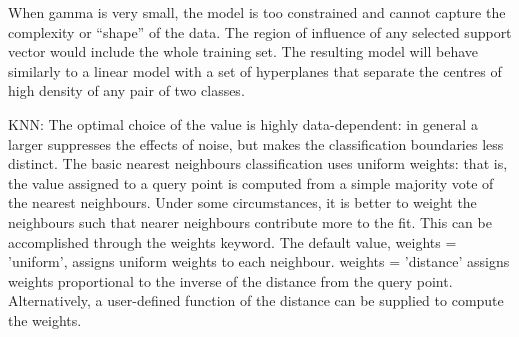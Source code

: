 \documentclass[runningheads]{llncs}
\begin{document}
When gamma is very small, the model is too constrained and cannot capture the complexity or “shape” of the data. The region of influence of any selected support vector would include the whole training set. The resulting model will behave similarly to a linear model with a set of hyperplanes that separate the centres of high density of any pair of two classes.

KNN: 
The optimal choice of the value  is highly data-dependent: in general a larger  suppresses the effects of noise, but makes the classification boundaries less distinct.
The basic nearest neighbours classification uses uniform weights: that is, the value assigned to a query point is computed from a simple majority vote of the nearest neighbours. Under some circumstances, it is better to weight the neighbours such that nearer neighbours contribute more to the fit. This can be accomplished through the weights keyword. The default value, weights = 'uniform', assigns uniform weights to each neighbour. weights = 'distance' assigns weights proportional to the inverse of the distance from the query point. Alternatively, a user-defined function of the distance can be supplied to compute the weights.
%
%
%
%
%
%
%
%
%
%
%
%
\pagebreak
\end{document}
